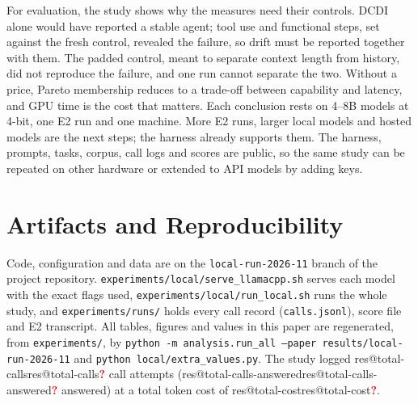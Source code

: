\documentclass[conference]{IEEEtran}
\makeatletter
\newcommand{\res}[1]{\ifcsname res@#1\endcsname\csname res@#1\endcsname\else\pending{#1}\fi}
\newcommand{\pending}[1]{\textcolor{red}{\textbf{?}}}
\makeatother
\begin{document}
For evaluation, the study shows why the measures need their controls. DCDI alone would have
reported a stable agent; tool use and functional steps, set against the fresh control, revealed
the failure, so drift must be reported together with them. The padded control, meant to separate
context length from history, did not reproduce the failure, and one run cannot separate the two. Without
a price, Pareto membership reduces to a trade-off between capability and latency, and GPU time
is the cost that matters. Each conclusion rests on 4--8B models at 4-bit, one E2 run and one
machine. More E2 runs, larger local models and hosted models are the next steps; the harness
already supports them.
The harness, prompts, tasks, corpus, call logs and scores are public, so the same study can be
repeated on other hardware or extended to API models by adding keys.

\section*{Artifacts and Reproducibility}
Code, configuration and data are on the \texttt{local-run-2026-11} branch of the project
repository. \texttt{experiments/local/serve\_llamacpp.sh} serves each model with the exact flags
used, \texttt{experiments/local/run\_local.sh} runs the whole study, and
\texttt{experiments/runs/} holds every call record (\texttt{calls.jsonl}), score file and E2
transcript. All tables, figures and values in this paper are regenerated, from \texttt{experiments/}, by
\texttt{python -m analysis.run\_all --paper results/local-run-2026-11} and
\texttt{python local/extra\_values.py}. The study logged \res{total-calls} call attempts
(\res{total-calls-answered} answered) at a total token cost of \res{total-cost}.



\end{document}

